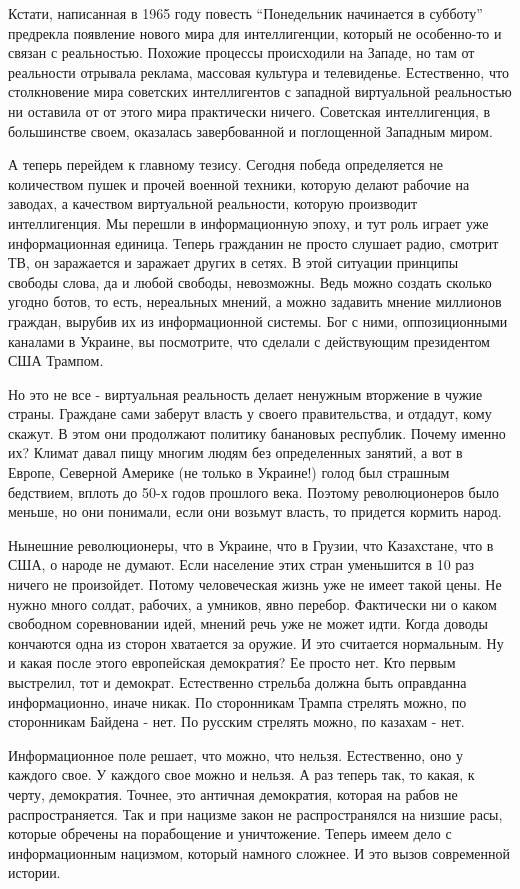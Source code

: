 Кстати, написанная в 1965 году повесть \enquote{Понедельник начинается в субботу}
предрекла появление нового мира для интеллигенции, который не особенно-то и
связан с реальностью. Похожие процессы происходили на Западе, но там от
реальности отрывала реклама, массовая культура и телевиденье. Естественно, что
столкновение мира советских интеллигентов с западной виртуальной реальностью ни
оставила от от этого мира практически ничего. Советская интеллигенция, в
большинстве своем, оказалась завербованной и поглощенной Западным миром.  

А теперь перейдем к главному тезису. Сегодня победа определяется не количеством
пушек и прочей военной техники, которую делают рабочие на заводах, а качеством
виртуальной реальности, которую производит интеллигенция. Мы перешли в
информационную эпоху, и тут роль играет уже информационная единица. Теперь
гражданин не просто слушает радио, смотрит ТВ, он заражается и заражает других
в сетях. В этой ситуации принципы свободы слова, да и любой свободы,
невозможны. Ведь можно создать сколько угодно ботов, то есть, нереальных
мнений, а можно задавить мнение миллионов граждан, вырубив их из информационной
системы. Бог с ними, оппозиционными каналами в Украине, вы посмотрите, что
сделали с действующим президентом США Трампом. 

Но это не все - виртуальная реальность делает ненужным вторжение в чужие
страны. Граждане сами заберут власть у своего правительства, и отдадут, кому
скажут. В этом они продолжают политику банановых республик. Почему именно их?
Климат давал пищу многим людям без определенных занятий, а вот в Европе,
Северной Америке (не только в Украине!) голод был страшным бедствием, вплоть до
50-х годов прошлого века.  Поэтому революционеров было меньше, но они понимали,
если они возьмут власть, то придется кормить народ. 

Нынешние революционеры, что в Украине, что в Грузии, что Казахстане, что в США,
о народе не думают. Если население этих стран уменьшится в 10 раз ничего не
произойдет. Потому человеческая жизнь уже не имеет такой цены. Не нужно много
солдат, рабочих, а умников, явно перебор. Фактически ни о каком свободном
соревновании идей, мнений речь уже не может идти. Когда доводы кончаются одна
из сторон хватается за оружие. И это считается нормальным. Ну и какая после
этого европейская демократия? Ее просто нет. Кто первым выстрелил, тот и
демократ. Естественно стрельба должна быть оправданна информационно, иначе
никак. По сторонникам Трампа стрелять можно, по сторонникам Байдена - нет. По
русским стрелять можно, по казахам - нет. 

Информационное поле решает, что можно, что нельзя. Естественно, оно у каждого
свое. У каждого свое можно и нельзя. А раз теперь так, то какая, к черту,
демократия. Точнее, это античная демократия, которая на рабов не
распространяется. Так и при нацизме закон не распространялся на низшие расы,
которые обречены на порабощение и уничтожение. Теперь имеем дело с
информационным нацизмом, который намного сложнее.  И это вызов современной
истории.

